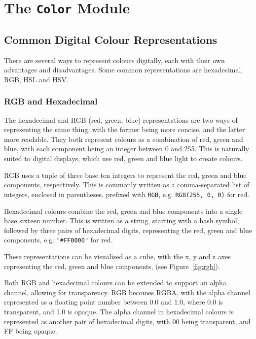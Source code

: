 \documentclass[../main.tex]{subfiles}
\begin{document}
    \section{The \texttt{Color}
        Module}

            \subsection{Common Digital Colour Representations}
                There are several ways to represent colours digitally, each with their own
                advantages and disadvantages.
        Some common representations are hexadecimal, RGB, HSL and HSV.

        \subsubsection{RGB and Hexadecimal}
            The hexadecimal and RGB (red, green, blue) representations are two ways of
                representing the same thing, with the former being more concise, and the latter
                more readable.
            They both represent colours as a combination of red, green and blue, with each
                component being an integer between 0 and 255.
            This is naturally suited to digital displays, which use red, green and blue
                light to create colours.

            RGB uses a tuple of three base ten integers to represent the red, green and
                blue components, respectively.
            This is commonly written as a comma-separated list of integers, enclosed in
                parentheses, prefixed with \texttt{RGB}, e.g. \texttt{RGB(255, 0, 0)} for red.

            Hexadecimal colours combine the red, green and blue components into a single
                base sixteen number.
            This is written as a string, starting with a hash symbol, followed by three
                pairs of hexadecimal digits, representing the red, green and blue components,
                e.g. \texttt{"\#FF0000"} for red.

            These representations can be visualised as a cube, with the x, y and z axes
                representing the red, green and blue components, (see Figure~\ref{fig:rgb}).

            Both RGB and hexadecimal colours can be extended to support an alpha channel,
                allowing for transparency.
            RGB becomes RGBA, with the alpha channel represented as a floating point number
                between 0.0 and 1.0, where 0.0 is transparent, and 1.0 is opaque.
            The alpha channel in hexadecimal colours is represented as another pair of
                hexadecimal digits, with 00 being transparent, and FF being opaque.
\end{document}
